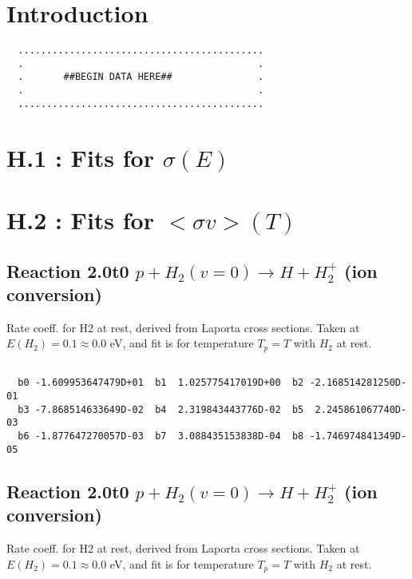 \section{Introduction}

\begin{small}\begin{verbatim}
  ...........................................
  .                                         .
  .       ##BEGIN DATA HERE##               .
  .                                         .
  ...........................................
\end{verbatim}\end{small}

\section{H.1 :  Fits for $\sigma(E) $}

\section{H.2 :  Fits for $<\sigma v> (T)$}

\subsection{
Reaction 2.0t0
$ p + H_2(v=0) \rightarrow H + H_2^+$ (ion conversion)
}
Rate coeff. for H2 at rest, derived from Laporta cross sections.
Taken at $E(H_2) = 0.1 \approx 0.0$ eV,  and fit is for temperature $T_p=T$ with $H_2$ at rest.

\begin{small}\begin{verbatim}

  b0 -1.609953647479D+01  b1  1.025775417019D+00  b2 -2.168514281250D-01
  b3 -7.868514633649D-02  b4  2.319843443776D-02  b5  2.245861067740D-03
  b6 -1.877647270057D-03  b7  3.088435153838D-04  b8 -1.746974841349D-05

\end{verbatim}\end{small}

\newpage
\subsection{
Reaction 2.0t0
$ p + H_2(v=0) \rightarrow H + H_2^+$ (ion conversion)
}
Rate coeff. for H2 at rest, derived from Laporta cross sections.
Taken at $E(H_2) = 0.1 \approx 0.0$ eV,  and fit is for temperature $T_p=T$ with $H_2$ at rest.

